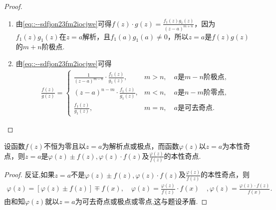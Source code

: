\documentclass[../../main.tex]{subfiles}%
\begin{document}
\begin{proof}
\begin{enumerate}[(1)]
\item 由\eqref{eq::--sdfjon23fm2iocjwe}可得$f(z)\cdot g(z)=\frac{f_1(z)g_1(z)}{(z-a)^{m+n}}$，因为$f_1(z)g_1(z)$在$z=a$解析，且$f_1(a)g_1(a)\neq0$，所以$z=a$是$f(z)g(z)$的$m+n$阶极点.

\item 由\eqref{eq::--sdfjon23fm2iocjwe}可得
\begin{align*}
\frac{f(z)}{g(z)}=
\begin{cases}
\frac{1}{(z-a)^{m-n}}\cdot\frac{f_1(z)}{g_1(z)},&m>n,\quad a\text{是}m-n\text{阶极点},\\
(z-a)^{n-m}\cdot\frac{f_1(z)}{g_1(z)},&m<n,\quad a\text{是}n-m\text{阶零点},\\
\frac{f_1(z)}{g_1(z)},&m=n,\quad a\text{是可去奇点}.
\end{cases}
\end{align*}
\end{enumerate}

\end{proof}

\begin{proposition}\label{proposition:本性奇点的积和差商仍是本性奇点}
设函数$f(z)$不恒为零且以$z=a$为解析点或极点，而函数$\varphi(z)$以$z=a$为本性奇点，则$z=a$是$\varphi(z)\pm f(z),\varphi(z)\cdot f(z)$及$\frac{\varphi(z)}{f(z)}$的本性奇点.
\end{proposition}
\begin{proof}

反证,如果$z=a$不是$\varphi(z)\pm f(z),\varphi(z)\cdot f(z)$及$\frac{\varphi(z)}{f(z)}$的本性奇点，则
\begin{align*}
\varphi (z)=\left[ \varphi (z)\pm f(z) \right] \mp f\left( x \right) ,\quad \varphi (z)=\frac{\varphi (z)}{f(z)}\cdot f\left( x \right) \quad ,\varphi (z)=\frac{\varphi (z)\cdot f(z)}{f\left( x \right)}.
\end{align*}
由和知$\varphi(z)$就以$z=a$为可去奇点或极点或零点,这与题设矛盾.

\end{proof}
\end{document}
